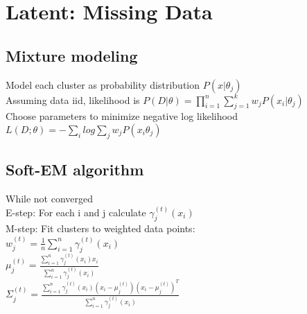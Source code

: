 \section*{Latent: Missing Data}
\subsection*{Mixture modeling}
Model each cluster as probability distribution $P(x|\theta_j)$\\
Assuming data iid, likelihood is $P(D|\theta) = \prod_{i=1}^n \sum_{j=1}^k w_j P(x_i|\theta_j)$\\
Choose parameters to minimize negative log likelihood\\
$L(D;\theta) = - \sum_i log \sum_j w_j P(x_i \theta_j)$


\subsection*{Soft-EM algorithm}
While not converged\\
E-step: For each i and j calculate $\gamma_j^{(t)}(x_i)$\\
M-step: Fit clusters to weighted data points:\\
$w_j^(t) = \frac{1}{n} \sum_{i=1}^n \gamma_j^{(t)} (x_i)$\\
$\mu_j^{(t)} = \frac{\sum_{i=1}^n \gamma_j^{(t)} (x_i) x_i}{\sum_{i=1}^n \gamma_j^{(t)} (x_i)}$\\
$\Sigma_j^{(t)} = \frac{\sum_{i=1}^n \gamma_j^{(t)}(x_i) (x_i - \mu_j^{(t)}) (x_i - \mu_j^{(t)})^T}{\sum_{i=1}^n \gamma_j^{(t)}(x_i)}$

